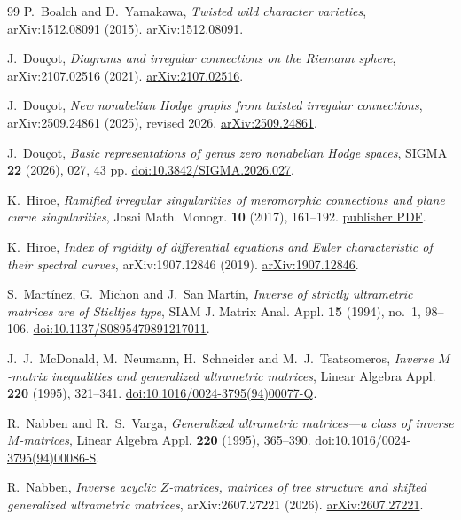 \documentclass[11pt,a4paper]{amsart}
\theoremstyle{plain}
\theoremstyle{definition}
\begin{document}
\begin{thebibliography}{99}
P.~Boalch and D.~Yamakawa,
\emph{Twisted wild character varieties},
arXiv:1512.08091 (2015).
\href{https://arxiv.org/abs/1512.08091}{arXiv:1512.08091}.

J.~Dou\c cot,
\emph{Diagrams and irregular connections on the Riemann sphere},
arXiv:2107.02516 (2021).
\href{https://arxiv.org/abs/2107.02516}{arXiv:2107.02516}.

J.~Dou\c cot,
\emph{New nonabelian Hodge graphs from twisted irregular connections},
arXiv:2509.24861 (2025), revised 2026.
\href{https://arxiv.org/abs/2509.24861}{arXiv:2509.24861}.

J.~Dou\c cot,
\emph{Basic representations of genus zero nonabelian Hodge spaces},
SIGMA \textbf{22} (2026), 027, 43 pp.
\href{https://doi.org/10.3842/SIGMA.2026.027}{doi:10.3842/SIGMA.2026.027}.

K.~Hiroe,
\emph{Ramified irregular singularities of meromorphic connections and plane curve singularities},
Josai Math. Monogr. \textbf{10} (2017), 161--192.
\href{https://libir.josai.ac.jp/il/user_contents/02/G0000284repository/pdf/JOS-13447777-1011.pdf}{publisher PDF}.

K.~Hiroe,
\emph{Index of rigidity of differential equations and Euler characteristic of their spectral
curves},
arXiv:1907.12846 (2019).
\href{https://arxiv.org/abs/1907.12846}{arXiv:1907.12846}.

S.~Mart\'{i}nez, G.~Michon and J.~San Mart\'{i}n,
\emph{Inverse of strictly ultrametric matrices are of Stieltjes type},
SIAM J. Matrix Anal. Appl. \textbf{15} (1994), no.~1, 98--106.
\href{https://doi.org/10.1137/S0895479891217011}{doi:10.1137/S0895479891217011}.

J.~J.~McDonald, M.~Neumann, H.~Schneider and M.~J.~Tsatsomeros,
\emph{Inverse $M$-matrix inequalities and generalized ultrametric matrices},
Linear Algebra Appl. \textbf{220} (1995), 321--341.
\href{https://doi.org/10.1016/0024-3795(94)00077-Q}{doi:10.1016/0024-3795(94)00077-Q}.

R.~Nabben and R.~S.~Varga,
\emph{Generalized ultrametric matrices---a class of inverse $M$-matrices},
Linear Algebra Appl. \textbf{220} (1995), 365--390.
\href{https://doi.org/10.1016/0024-3795(94)00086-S}{doi:10.1016/0024-3795(94)00086-S}.

R.~Nabben,
\emph{Inverse acyclic $Z$-matrices, matrices of tree structure and shifted generalized
ultrametric matrices},
arXiv:2607.27221 (2026).
\href{https://arxiv.org/abs/2607.27221}{arXiv:2607.27221}.

\end{thebibliography}
\end{document}
